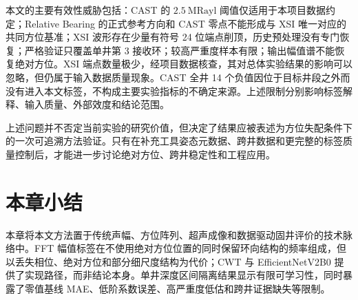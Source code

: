 本文的主要有效性威胁包括：CAST 的 $2.5~\mathrm{MRayl}$ 阈值仅适用于本项目数据约定；Relative Bearing 的正式参考方向和 CAST 零点不能形成与 XSI 唯一对应的共同方位基准；XSI 波形存在少量有符号 24 位端点削顶，历史预处理没有专门恢复；严格验证只覆盖单井第 3 接收环；较高严重度样本有限；输出幅值谱不能恢复绝对方位。XSI 端点数量极少，经项目数据核查，其对总体实验结果的影响可以忽略，但仍属于输入数据质量现象。CAST 全井 14 个负值因位于目标井段之外而没有进入本文标签，不构成主要实验指标的不确定来源。上述限制分别影响标签解释、输入质量、外部效度和结论范围。

上述问题并不否定当前实验的研究价值，但决定了结果应被表述为方位失配条件下的一次可追溯方法验证。只有在补充工具姿态元数据、跨井数据和更完整的标签质量控制后，才能进一步讨论绝对方位、跨井稳定性和工程应用。

\section{本章小结}

本章将本文方法置于传统声幅、方位阵列、超声成像和数据驱动固井评价的技术脉络中。FFT 幅值标签在不使用绝对方位位置的同时保留环向结构的频率组成，但以丢失相位、绝对方位和部分细尺度结构为代价；CWT 与 EfficientNetV2B0 提供了实现路径，而非结论本身。单井深度区间隔离结果显示有限可学习性，同时暴露了零值基线 MAE、低阶系数误差、高严重度低估和跨井证据缺失等限制。
